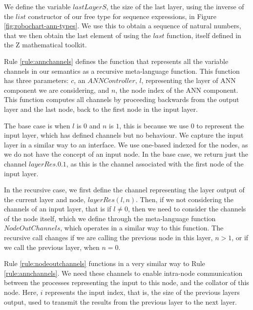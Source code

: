 We define the variable $lastLayerS$, the size of the last layer, using the inverse of the $list$ constructor of our free type for sequence expressions, in Figure \ref{fig:robochart-ann-types}. We use this to obtain a sequence of natural numbers, that we then obtain the last element of using the $last$ function, itself defined in the Z mathematical toolkit. 

Rule \ref{rule:annchannels} defines the function that represents all the variable channels in our semantics as a recursive meta-language function. This function has three parameters: $c$, an $ANNController$, $l$, representing the layer of ANN component we are considering, and $n$, the node index of the ANN component. This function computes all channels by proceeding backwards from the output layer and the last node, back to the first node in the input layer. 

The base case is when $l$ is $0$ and $n$ is $1$, this is because we use $0$ to represent the input layer, which has defined channels but no behaviour. We capture the input layer in a similar way to an interface. We use one-based indexed for the nodes, as we do not have the concept of an input node. In the base case, we return just the channel $layerRes.0.1$, as this is the channel associated with the first node of the input layer. 

In the recursive case, we first define the channel representing the layer output of the current layer and node, $layerRes(l,n)$. Then, if we not considering the channels of an input layer, that is if $l \neq 0$, then we need to consider the channels of the node itself, which we define through the meta-language function $NodeOutChannels$, which operates in a similar way to this function. The recursive call changes if we are calling the previous node in this layer, $n > 1$, or if we call the previous layer, when $n = 0$. 


Rule \ref{rule:nodeoutchannels} functions in a very similar way to Rule \ref{rule:annchannels}. We need these channels to enable intra-node communication between the processes representing the input to this node, and the collator of this node. Here, $i$ represents the input index, that is, the size of the previous layers output, used to transmit the results from the previous layer to the next layer. 


